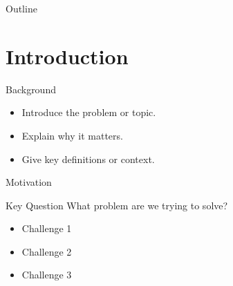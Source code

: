\documentclass[xcolor=dvipsnames,aspectratio=169]{beamer}
\title{\TalkTitle}
\author{\TalkAuthor}
\institute{\TalkInstitute}
\date{\TalkDate}
\begin{document}
\begin{frame}
    \titlepage
\end{frame}

\begin{frame}{Outline}
    \tableofcontents
\end{frame}

\section{Introduction}

\begin{frame}{Background}
    \begin{itemize}
        \item Introduce the problem or topic.
        \item Explain why it matters.
        \item Give key definitions or context.
    \end{itemize}
\end{frame}

\begin{frame}{Motivation}
    \begin{block}{Key Question}
        What problem are we trying to solve?
    \end{block}

    \begin{itemize}
        \item Challenge 1
        \item Challenge 2
        \item Challenge 3
    \end{itemize}
\end{frame}
\end{document}

